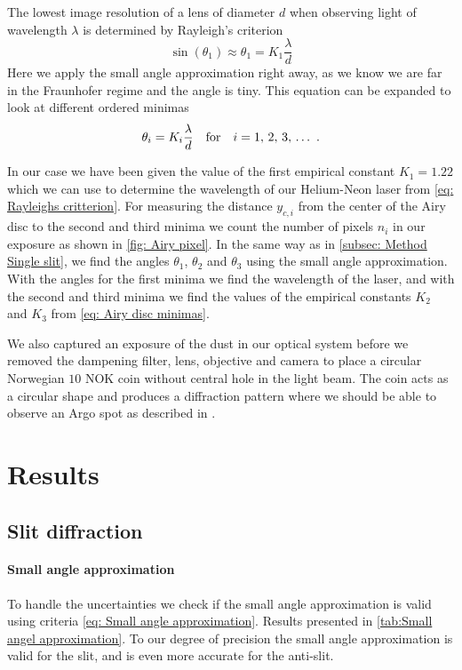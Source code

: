 \documentclass{emulateapj}
\begin{document}
The lowest image resolution of a lens of diameter $d$ when observing light of wavelength $\lambda$ is determined by Rayleigh's criterion
\begin{equation}
\sin(\theta_1) \approx \theta_{1} = K_1 \frac{\lambda}{d}
\label{eq: Rayleighs critterion}
\end{equation}
Here we apply the small angle approximation right away, as we know we are far in the Fraunhofer regime and the angle is tiny. This equation can be expanded to look at different ordered minimas
\begin{equation}
\theta_{i} = K_i \frac{\lambda}{d} \qfor i = 1,\, 2,\, 3,\, \ldots \text{ .}
\label{eq: Airy disc minimas}
\end{equation}

In our case we have been given the value of the first empirical constant $K_1 = 1.22$ which we can use to determine the wavelength of our Helium-Neon laser from \cref{eq: Rayleighs critterion}. For measuring the distance $y_{c,i}$ from the center of the Airy disc to the second and third minima we count the number of pixels $n_i$ in our exposure as shown in \cref{fig: Airy pixel}. In the same way as in \cref{subsec: Method Single slit}, we find the angles $\theta_{1}$, $\theta_2$ and $\theta_3$ using the small angle approximation. With the angles for the first minima we find the wavelength of the laser, and with the second and third minima we find the values of the empirical constants $K_2$ and $K_3$ from \cref{eq: Airy disc minimas}.

We also captured an exposure of the dust in our optical system before we removed the dampening filter, lens, objective and camera to place a circular Norwegian $10$ NOK coin without central hole in the light beam. The coin acts as a circular shape and produces a diffraction pattern where we should be able to observe an Argo spot as described in \citep{wiki:Arago}. 

\section{Results}
\label{sec:results}
\subsection{Slit diffraction}
\label{subsec: Results/Slit}
\paragraph{Small angle approximation}
To handle the uncertainties we check if the small angle approximation is valid using criteria \cref{eq: Small angle approximation}. Results presented in \cref{tab:Small angel approximation}. To our degree of precision the small angle approximation is valid for the slit, and is even more accurate for the anti-slit.
\end{document}

